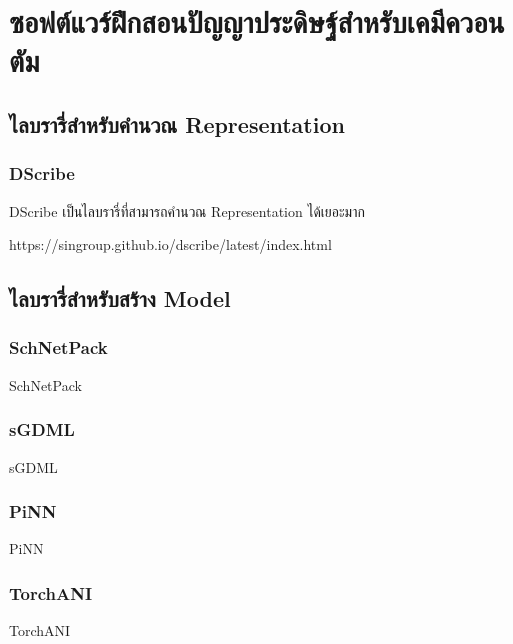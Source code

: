 

\chapter{ซอฟต์แวร์ฝึกสอนปัญญาประดิษฐ์สำหรับเคมีควอนตัม}
\label{ch:ml_lib}

\section{ไลบรารี่สำหรับคำนวณ Representation}

\subsection{DScribe}

DScribe เป็นไลบรารี่ที่สามารถคำนวณ Representation ได้เยอะมาก\cite{himanen2020}

https://singroup.github.io/dscribe/latest/index.html

\section{ไลบรารี่สำหรับสร้าง Model}

\subsection{SchNetPack}

SchNetPack\cite{schutt2019}

\subsection{sGDML}

sGDML\cite{chmiela2019}

\subsection{PiNN}

PiNN\cite{shao2020}

\subsection{TorchANI}

TorchANI\cite{gao2020}
